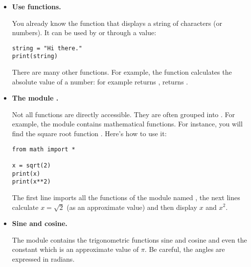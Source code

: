\documentclass[11pt,class=report,crop=false]{standalone}
\begin{document}
\begin{cours}
\sauteligne
\begin{itemize}
  \item \textbf{Use \Python{} functions.}
  
  You already know the  function that displays a string of characters (or numbers). It can be used by  or through a value: 
\begin{center}
\begin{minipage}{0.5\textwidth}
\begin{lstlisting}  
string = "Hi there."
print(string)
\end{lstlisting}
\end{minipage}
\end{center} 	 

  There are many other functions. For example, the function  calculates the absolute value of a number: for example  returns ,  returns .

  \item \textbf{The module .}

	Not all functions are directly accessible. They are often grouped into . For example, the  module contains mathematical functions. For instance, you will find the square root function . Here's how to use it: 
\begin{center}
\begin{minipage}{0.5\textwidth}
\begin{lstlisting} 
from math import *

x = sqrt(2)
print(x)
print(x**2)
\end{lstlisting}
\end{minipage}
\end{center} 	

The first line imports all the functions of the module named , the next lines calculate $x = \sqrt{2}$ (as an approximate value) and then display $x$ and $x^2$.	

  \item \textbf{Sine and cosine.} 
  
  The  module contains the trigonometric functions sine  and cosine  and even the constant \index{$\pi$} which is an approximate value of $\pi$. Be careful, the angles are expressed in radians.


\end{itemize}
\end{cours}
\end{document}
